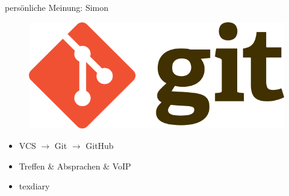 \documentclass[aspectratio=169]{beamer}
\begin{document}
\begin{frame}[plain]{persönliche Meinung: Simon}
    \begin{varwidth}{.4\textwidth}
        \begin{figure}
            \centering
            \includegraphics[width=.95\textwidth]{media/git-logo.png}
        \end{figure}
    \end{varwidth}
    \hfill
    \begin{varwidth}{.5\textwidth}
        \begin{itemize}\pause
            \item VCS $\rightarrow$ Git $\rightarrow$ GitHub\pause
            \item Treffen \& Absprachen \& VoIP\pause
            \item texdiary
        \end{itemize}
    \end{varwidth}
\end{frame}
\end{document}
